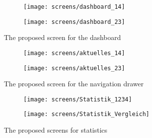 \begin{figure}[h]
	\centering
	\begin{subfigure}[b]{0.24\columnwidth}
		\centering
		\texttt{[image: screens/dashboard\_14]}
		\label{fig:dasboard:professional}
	\end{subfigure}
	\begin{subfigure}[b]{0.24\columnwidth}
		\centering
		\texttt{[image: screens/dashboard\_23]}
		\label{fig:dashboard:optimizer}
	\end{subfigure}
	\caption{The proposed screen for the dashboard}
	\label{fig:dashboard} %
\end{figure}

\begin{figure}[h]
	\centering
	\begin{subfigure}[b]{0.24\columnwidth}
		\centering
		\texttt{[image: screens/aktuelles\_14]}
		\label{fig:aktuelles:professional}
	\end{subfigure}
	\begin{subfigure}[b]{0.24\columnwidth}
		\centering
		\texttt{[image: screens/aktuelles\_23]}
		\label{fig:aktuelles:optimizer}
	\end{subfigure}
	\caption{The proposed screen for the navigation drawer}
	\label{fig:aktuelles} %
\end{figure}

\begin{figure}[h]
	\centering
	\begin{subfigure}[b]{0.24\columnwidth}
		\centering
		\texttt{[image: screens/Statistik\_1234]}
		\label{fig:statistik:professional}
	\end{subfigure}
	\begin{subfigure}[b]{0.24\columnwidth}
		\centering
		\texttt{[image: screens/Statistik\_Vergleich]}
		\label{fig:statistik:optimizer}
	\end{subfigure}
	\caption{The proposed screens for statistics}
	\label{fig:statistik} %
\end{figure}

